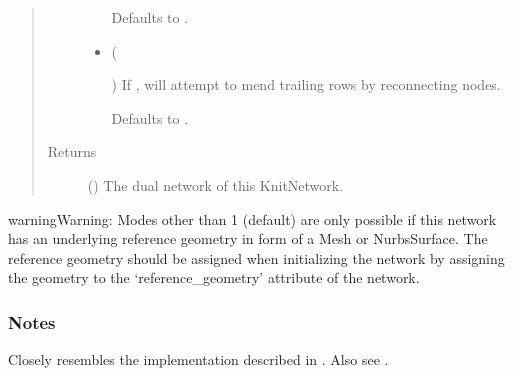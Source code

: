 \documentclass[letterpaper,10pt,english]{sphinxmanual}
\begin{document}
\begin{fulllineitems}
\begin{fulllineitems}
\begin{quote}
\begin{description}
\begin{itemize}
Defaults to .


\item {} 
 (%
\begin{footnote}[121]\sphinxAtStartFootnote
{}
%
\end{footnote}\sphinxstyleliteralemphasis{\sphinxupquote{, }}) \textendash{} 
If , will attempt to mend trailing rows by reconnecting
nodes.

Defaults to .


\end{itemize}

\item[{Returns}] \leavevmode
{} ({\hyperref[\detokenize{cockatoo:cockatoo.KnitDiNetwork}]{}}) \textendash{} The dual network of this KnitNetwork.

\end{description}\end{quote}

\begin{sphinxadmonition}{warning}{Warning:}
Modes other than \sphinxhyphen{}1 (default) are only possible if this network has an
underlying reference geometry in form of a Mesh or NurbsSurface. The
reference geometry  should be assigned when initializing the network by
assigning the geometry to the ‘reference\_geometry’ attribute of the
network.
\end{sphinxadmonition}
\subsubsection*{Notes}

Closely resembles the implementation described in  \sphinxfootnotemark[1]. Also see
 \sphinxfootnotemark[2].

\end{fulllineitems}


\end{fulllineitems}
\end{document}
